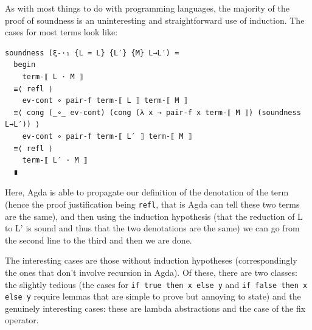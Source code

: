 \documentclass[12pt,a4paper,twoside,openright]{report}
\begin{document}
As with most things to do with programming languages, the majority of the proof of soundness is an uninteresting and straightforward use of induction. The cases for most terms look like:
\begin{verbatim}
soundness (ξ-·₁ {L = L} {L′} {M} L→L′) =
  begin
    term-⟦ L · M ⟧
  ≡⟨ refl ⟩
    ev-cont ∘ pair-f term-⟦ L ⟧ term-⟦ M ⟧
  ≡⟨ cong (_∘_ ev-cont) (cong (λ x → pair-f x term-⟦ M ⟧) (soundness L→L′)) ⟩
    ev-cont ∘ pair-f term-⟦ L′ ⟧ term-⟦ M ⟧
  ≡⟨ refl ⟩
    term-⟦ L′ · M ⟧
  ∎
\end{verbatim}
Here, Agda is able to propagate our definition of the denotation of the term (hence the proof justification being \texttt{refl}, that is Agda can tell these two terms are the same), and then using the induction hypothesis (that the reduction of L to L' is sound and thus that the two denotations are the same) we can go from the second line to the third and then we are done. 

The interesting cases are those without induction hypotheses (correspondingly the ones that don't involve recursion in Agda). Of these, there are two classes: the slightly tedious (the cases for \texttt{if true then x else y} and \texttt{if false then x else y} require lemmas that are simple to prove but annoying to state) and the genuinely interesting cases: these are lambda abstractions and the case of the fix operator.
\end{document}
